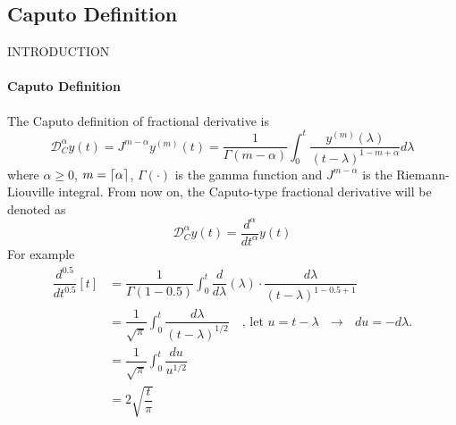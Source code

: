 \subsection{Caputo Definition}
\begin{frame}{INTRODUCTION}
\framesubtitle{Caputo Definition}
The Caputo definition of fractional derivative is
\begin{equation}
    \mathcal{D}_C^\alpha y(t) = J^{m-\alpha}y^{(m)}(t) = \dfrac{1}{\Gamma(m-\alpha)}\int_0^t \dfrac{y^{(m)}(\lambda)}{(t-\lambda)^{1-m+\alpha}}d\lambda
\end{equation}
where $\alpha\geq0$, $m=\lceil\alpha\rceil$, $\Gamma(\cdot)$ is the gamma function and $J^{m-\alpha}$ is the Riemann-Liouville integral. From now on, the Caputo-type fractional derivative will be denoted as
\begin{equation}
    \mathcal{D}_C^\alpha y(t)=\dfrac{d^\alpha}{dt^\alpha}y(t)
\end{equation}
For example
    \begin{align*}
        \dfrac{d^{0.5}}{dt^{0.5}} [t]&= \dfrac{1}{\Gamma(1-0.5)}\int_0^t \dfrac{d}{d\lambda}(\lambda)\cdot\dfrac{d\lambda}{(t-\lambda)^{1-0.5+1}}\\
      &= \dfrac{1}{\sqrt{\pi}}\int_0^t \dfrac{d\lambda}{(t-\lambda)^{1/2}}\quad\text{, let $u=t-\lambda$ $\rightarrow$ $du=-d\lambda$.}\\
      &= \dfrac{1}{\sqrt{\pi}}\int_0^t \dfrac{du}{u^{1/2}}\\
      &=2\sqrt{\dfrac{t}{\pi}}
    \end{align*}
\end{frame}

